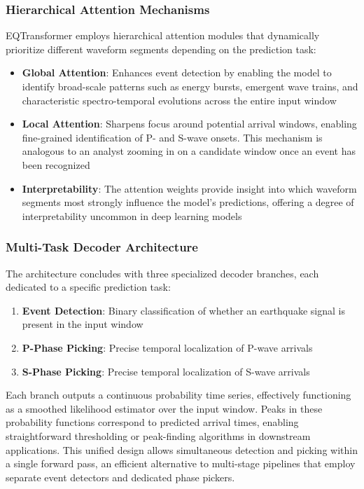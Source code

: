 \subsubsection{Hierarchical Attention Mechanisms}
EQTransformer employs hierarchical attention modules that dynamically
prioritize different waveform segments depending on the prediction task:
\begin{itemize}
  \item \textbf{Global Attention}: Enhances event detection by enabling the
    model to identify broad-scale patterns such as energy bursts, emergent wave
    trains, and characteristic spectro-temporal evolutions across the entire
    input window

  \item \textbf{Local Attention}: Sharpens focus around potential arrival
    windows, enabling fine-grained identification of P- and S-wave onsets. This
    mechanism is analogous to an analyst zooming in on a candidate window once
    an event has been recognized

  \item \textbf{Interpretability}: The attention weights provide insight
    into which waveform segments most strongly influence the model's
    predictions,
    offering a degree of interpretability uncommon in deep learning models
\end{itemize}

\subsubsection{Multi-Task Decoder Architecture}
The architecture concludes with three specialized decoder branches, each
dedicated to a specific prediction task:
\begin{enumerate}
  \item \textbf{Event Detection}: Binary classification of whether an
    earthquake signal is present in the input window
  \item \textbf{P-Phase Picking}: Precise temporal localization of P-wave
    arrivals
  \item \textbf{S-Phase Picking}: Precise temporal localization of S-wave
    arrivals
\end{enumerate}

Each branch outputs a continuous probability time series, effectively
functioning as a smoothed likelihood estimator over the input window. Peaks in
these probability functions correspond to predicted arrival times, enabling
straightforward thresholding or peak-finding algorithms in downstream
applications. This unified design allows simultaneous detection and picking
within a single forward pass, an efficient alternative to multi-stage
pipelines that employ separate event detectors and dedicated phase pickers.

